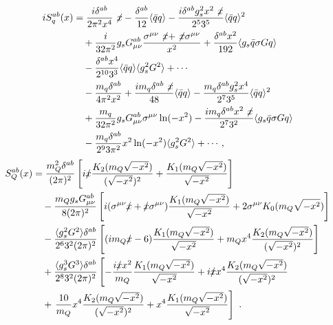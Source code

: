 \documentclass[prd,a4paper,preprint,preprintnumbers,nofootinbib,superscriptaddress]{revtex4-2}
\begin{document}
\begin{equation}
  \label{eq:8}
\begin{aligned}
iS_q^{ab}(x) &= \frac{i \delta^{ab}}{2\pi^2 x^4} \not\!x
   - \frac{\delta^{ab}}{12} \langle \bar{q}q \rangle
   - \frac{i \delta^{ab} g_s^2 x^2 \not\!x}{2^5 3^5} \langle \bar{q}q \rangle^2 \\
&\quad + \frac{i}{32\pi^2} g_s G_{\mu\nu}^{ab}
   \frac{\sigma^{\mu\nu}\not\!x + \not\!x \sigma^{\mu\nu}}{x^2}
   + \frac{\delta^{ab} x^2}{192} \langle g_s \bar{q}\sigma G q \rangle \\
&\quad - \frac{\delta^{ab} x^4}{2^{10} 3^3} \langle \bar{q}q \rangle \langle g_s^2 G^2 \rangle
   + \cdots \\
&\quad - \frac{m_q \delta^{ab}}{4\pi^2 x^2}
   + \frac{i m_q \delta^{ab} \not\!x}{48} \langle \bar{q}q \rangle
   - \frac{m_q \delta^{ab} g_s^2 x^4}{2^7 3^5} \langle \bar{q}q \rangle^2 \\
&\quad + \frac{m_q}{32\pi^2} g_s G_{\mu\nu}^{ab} \sigma^{\mu\nu} \ln(-x^2)
   - \frac{i m_q \delta^{ab} x^2 \not\!x}{2^7 3^2} \langle g_s \bar{q}\sigma G q \rangle \\
&\quad - \frac{m_q \delta^{ab}}{2^9 3\pi^2} x^2 \ln(-x^2) \langle g_s^2 G^2 \rangle
   + \cdots,
\end{aligned}
\end{equation}
%
%
\begin{equation}
  \label{eq:9}
\begin{aligned}
S_Q^{ab}(x) &= \frac{m_Q^2 \delta^{ab}}{(2 \pi)^2} \left[
i \rlap{/}x \frac{K_2(m_Q \sqrt{-x^2})}{(\sqrt{-x^2})^2} +
\frac{K_1(m_Q \sqrt{-x^2})}{\sqrt{-x^2}} \right] \\
&\quad - \frac{m_Q g_s G_{\mu\nu}^{ab}}{8 (2\pi)^2} \left[
i (\sigma^{\mu\nu} \rlap{/}x + \rlap{/}x \sigma^{\mu\nu}) 
\frac{K_1(m_Q \sqrt{-x^2})}{\sqrt{-x^2}} +
2 \sigma^{\mu\nu} K_0(m_Q \sqrt{-x^2}) \right] \\
&\quad - \frac{\langle g_s^2 G^2 \rangle \delta^{ab}}{2^6 3^2 (2 \pi)^2} \left[
(i m_Q \rlap{/}x - 6) \frac{K_1(m_Q \sqrt{-x^2})}{\sqrt{-x^2}} +
m_Q x^4 \frac{K_2(m_Q \sqrt{-x^2})}{(\sqrt{-x^2})^2} \right] \\
&\quad + \frac{\langle g_s^3 G^3 \rangle \delta^{ab}}{2^8 3^2 (2 \pi)^2} \left[
- \frac{i \rlap{/}x x^2}{m_Q} \frac{K_1(m_Q \sqrt{-x^2})}{\sqrt{-x^2}} +
i \rlap{/}x x^4 \frac{K_2(m_Q \sqrt{-x^2})}{(\sqrt{-x^2})^2} \right. \\
&\quad + \left. \frac{10}{m_Q} x^4 \frac{K_2(m_Q \sqrt{-x^2})}{(\sqrt{-x^2})^2} +
x^4 \frac{K_1(m_Q \sqrt{-x^2})}{\sqrt{-x^2}} \right]~.
\end{aligned}
\end{equation}
%
\end{document}
